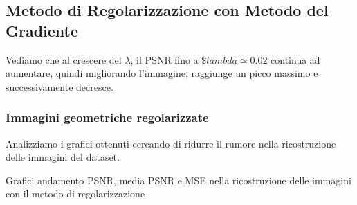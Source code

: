 \subsection{Metodo di Regolarizzazione con Metodo del Gradiente }
Vediamo che al crescere del $\lambda$, il PSNR fino a $\$ lambda \simeq 0.02$ continua ad aumentare, 
quindi migliorando l'immagine, raggiunge un picco massimo e successivamente decresce.

\subsubsection{Immagini geometriche regolarizzate}
Analizziamo i grafici ottenuti cercando di ridurre il rumore nella ricostruzione delle immagini del dataset. 

Grafici andamento PSNR, media PSNR e MSE nella ricostruzione delle immagini con il metodo di regolarizzazione

